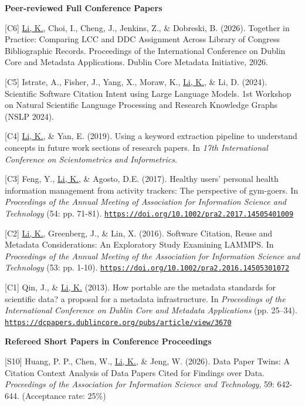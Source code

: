 \documentclass[margin, 10pt]{res} %
\begin{document}
\begin{resume}
\textbf{Peer-reviewed Full Conference Papers}

[C6] \underline{Li, K.}, Choi, I., Cheng, J., Jenkins, Z., \& Dobreski, B. (2026). Together in Practice: Comparing LCC and DDC Assignment Across Library of Congress Bibliographic Records. Proceedings of the International Conference on Dublin Core and Metadata Applications. Dublin Core Metadata Initiative, 2026.

[C5] Istrate, A., Fisher, J., Yang, X., Moraw, K., \underline{Li, K.}, \& Li, D. (2024). Scientific Software Citation Intent using Large Language Models. 1st Workshop on Natural Scientific Language Processing and Research Knowledge Graphs (NSLP 2024).

[C4] \underline{Li, K.}, \& Yan, E. (2019). Using a keyword extraction pipeline to understand concepts in future work sections of research papers. In \textit{17th International Conference on Scientometrics and Informetrics}.

[C3] Feng, Y., \underline{Li, K.}, \& Agosto, D.E. (2017). Healthy users' personal health information management from activity trackers: The perspective of gym-goers. In \textit{Proceedings of the Annual Meeting of Association for Information Science and Technology} (54: pp. 71-81). \href{https://doi.org/10.1002/pra2.2017.14505401009}{\nolinkurl{https://doi.org/10.1002/pra2.2017.14505401009}}

[C2] \underline{Li, K.}, Greenberg, J., \& Lin, X. (2016). Software Citation, Reuse and Metadata Considerations: An Exploratory Study Examining LAMMPS. In \textit{Proceedings of the Annual Meeting of the Association for Information Science and Technology} (53: pp. 1-10). \href{https://doi.org/10.1002/pra2.2016.14505301072}{\nolinkurl{https://doi.org/10.1002/pra2.2016.14505301072}}

[C1] Qin, J., \& \underline{Li, K.} (2013). How portable are the metadata standards for scientific data? a proposal for a metadata infrastructure. In \textit{Proceedings of the International Conference on Dublin Core and Metadata Applications} (pp. 25–34). \href{https://dcpapers.dublincore.org/pubs/article/view/3670}{\nolinkurl{https://dcpapers.dublincore.org/pubs/article/view/3670}}

\textbf{Refereed Short Papers in Conference Proceedings}

[S10] Huang, P. P., Chen, W., \underline{Li, K.}, \& Jeng, W. (2026). Data Paper Twins: A Citation Context Analysis of Data Papers Cited for Findings over Data. \textit{Proceedings of the Association for Information Science and Technology}, 59: 642-644. (Acceptance rate: 25\%)


\end{resume}
\end{document}
